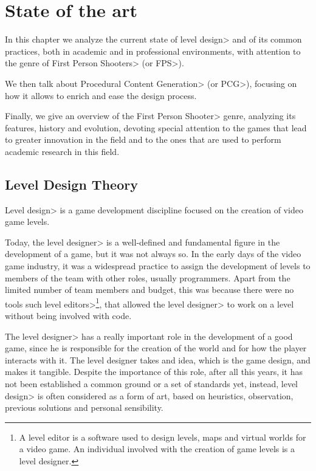 \chapter{State of the art}


In this chapter we analyze the current state of \<level design> and of its common practices, both in academic and in professional environments, with attention to the genre of \<First Person Shooters> (or \<FPS>).

\par

We then talk about \<Procedural Content Generation> (or \<PCG>), focusing on how it allows to enrich and ease the design process.

\par

Finally, we give an overview of the \<First Person Shooter> genre, analyzing its features, history and evolution, devoting special attention to the games that lead to greater innovation in the field and to the ones that are used to perform academic research in this field.


\section{Level Design Theory}

\<Level design> is a game development discipline focused on the creation of video game levels.

\par

Today, the \<level designer> is a well-defined and fundamental figure in the development of a game, but it was not always so. In the early days of the video game industry, it was a widespread practice to assign the development of levels to members of the team with other roles, usually programmers. Apart from the limited number of team members and budget, this was because there were no tools such \<level editors>\footnote{\label{levelEditorFootnote}A level editor is a software used to design levels, maps and virtual worlds for a video game. An individual involved with the creation of game levels is a level designer.}, that allowed the \<level designer> to work on a level without being involved with code.

\par

The \<level designer> has a really important role in the development of a good game, since he is responsible for the creation of the world and for how the player interacts with it. The level designer takes and idea, which is the game design, and makes it tangible.
Despite the importance of this role, after all this years, it has not been established a common ground or a set of standards yet, instead, \<level design> is often considered as a form of art, based on heuristics, observation, previous solutions and personal sensibility.

